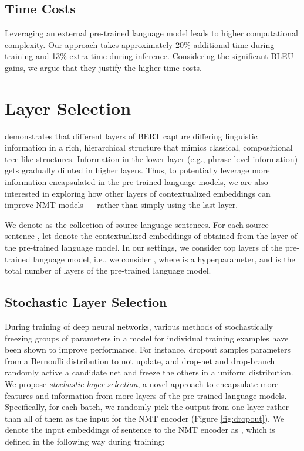 \documentclass[11pt]{article}
\begin{document}
\subsection{Time Costs}
Leveraging an external pre-trained language model leads to higher computational complexity. Our approach takes approximately 20\% additional time during training and 13\% extra time during inference. Considering the significant BLEU gains, we argue that they justify the higher time costs. 

\section{Layer Selection}
\label{sec:layer-dropout}
\citet{jawahar-etal-2019-bert} demonstrates that different layers of BERT capture differing linguistic information in a rich, hierarchical structure that mimics classical, compositional tree-like structures. Information in the lower layer (e.g., phrase-level information) gets gradually diluted in higher layers. Thus, to potentially leverage more information encapsulated in the pre-trained language models, we are also interested in exploring how other layers  of contextualized embeddings can improve NMT models --- rather than simply using the last layer. 

We denote  as the collection of source language sentences. For each source sentence , let  denote the contextualized embeddings of  obtained from the  layer of the pre-trained language model. In our settings, we consider top  layers of the pre-trained language model, i.e., we consider  , where  is a hyperparameter, and  is the total number of layers of the pre-trained language model. 



\subsection{Stochastic Layer Selection}
During training of deep neural networks,  various methods of stochastically freezing groups of parameters in a model for individual training examples have been shown to improve performance. For instance, dropout \citep{srivastava2014dropout} samples parameters from a Bernoulli distribution to not update, and drop-net \citep{Zhu2020Incorporating} and drop-branch \cite{fan2020multi} randomly active a candidate net and freeze the others in a uniform distribution. We propose \textit{stochastic layer selection}, a novel approach to encapsulate more features and information from more layers of the pre-trained language models. Specifically, for each batch, we randomly pick the output from one layer rather than all of them as the input for the NMT encoder (Figure \ref{fig:dropout}). We denote the input embeddings of sentence  to the NMT encoder as , which is defined in the following way during training:
\end{document}
